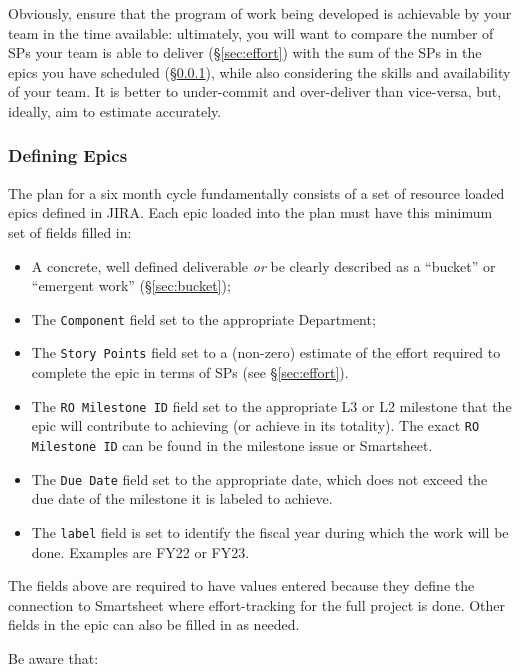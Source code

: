 Obviously, ensure that the program of work being developed is achievable by your team in the time available: ultimately, you will want to compare the number of \glspl{SP} your team is able to deliver (\S\ref{sec:effort}) with the sum of the \glspl{SP} in the \glspl{epic} you have scheduled (\S\ref{sec:planning-epics}), while also considering the skills and availability of your team.
It is better to under-commit and over-deliver than vice-versa, but, ideally, aim to estimate accurately.

\subsubsection{Defining Epics} \label{sec:planning-epics}

The plan for a six month \gls{cycle} fundamentally consists of a set of resource loaded \glspl{epic} defined in \gls{JIRA}.
Each \gls{epic} loaded into the plan must have this minimum set of fields filled in:

\begin{itemize}
\item A concrete, well defined deliverable \emph{or} be clearly described as a ``bucket'' or ``emergent work'' (\S\ref{sec:bucket});
\item The \texttt{Component} field set to the appropriate Department;
\item The \texttt{Story Points} field set to a (non-zero) estimate of the effort required to complete the \gls{epic} in terms of \glspl{SP} (see \S\ref{sec:effort}).
\item The \texttt{RO Milestone ID} field set to the appropriate L3 or L2 milestone that the epic will contribute to achieving (or achieve in its totality).
  The exact \texttt{RO Milestone ID} can be found in the milestone issue or Smartsheet.
\item The \texttt{Due Date} field set to the appropriate date, which does not exceed the due date of the milestone it is labeled to achieve.
\item The \texttt{label} field is set to identify the fiscal year during which the work will be done. Examples are FY22 or FY23.

\end{itemize}
The fields above are required to have values entered because they define the connection to Smartsheet where effort-tracking for the full project is done. Other fields in the epic can also be filled in as needed.

Be aware that:

